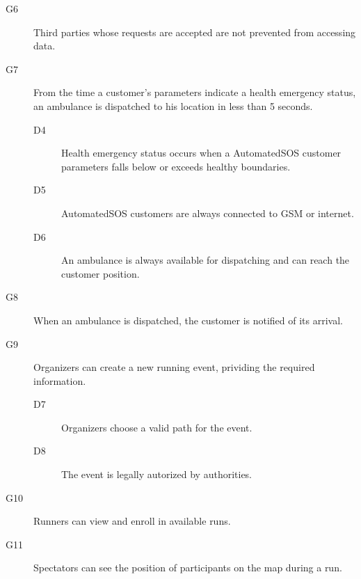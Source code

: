 \documentclass[../main.tex]{subfiles}
\begin{document}
\begin{description}
	\item [G6]  Third parties whose requests are accepted are not prevented from accessing data.
	\begin{description}
		\item
	\end{description}

	\item [G7]  From the time a customer's parameters indicate a health emergency status, an ambulance is dispatched to his location in less than 5 seconds.
	\begin{description}
		\item [D4] Health emergency status occurs when a AutomatedSOS customer parameters falls below or exceeds healthy boundaries.
		\item [D5] AutomatedSOS customers are always connected to GSM or internet.
		\item [D6] An ambulance is always available for dispatching and can reach the customer position.
	\end{description}

	\item [G8]  When an ambulance is dispatched, the customer is notified of its arrival.
	\begin{description}
		\item
	\end{description}

	\item [G9]  Organizers can create a new running event, prividing the required information.
	\begin{description}
		\item [D7] Organizers choose a valid path for the event.
		\item [D8] The event is legally autorized by authorities.
	\end{description}

	\item [G10]  Runners can view and enroll in available runs.
	\begin{description}
		\item []
	\end{description}

	\item [G11] Spectators can see the position of participants on the map during a run.
	\begin{description}
		\item
	\end{description}
\end{description}
\end{document}
